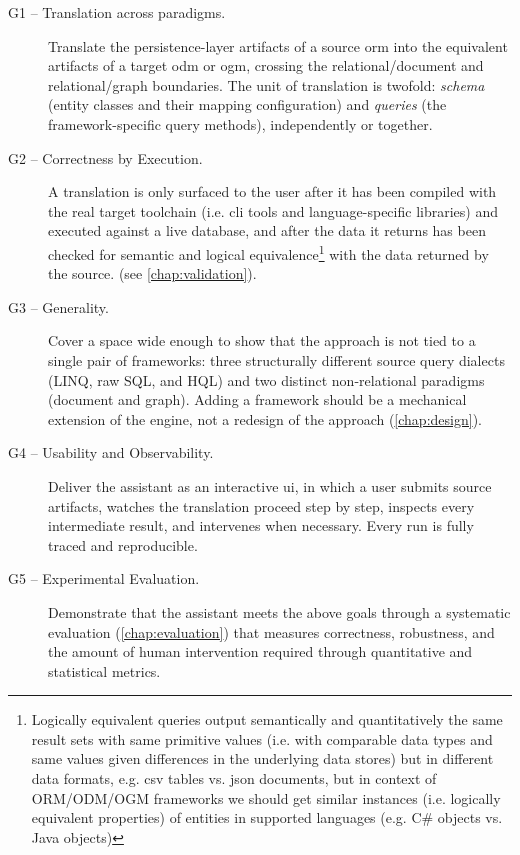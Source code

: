 \begin{description}
  \item[G1 -- Translation across paradigms.] Translate the persistence-layer artifacts of a source \acrshort{orm} into the equivalent artifacts of a target \acrshort{odm} or \acrshort{ogm}, crossing the relational/document and relational/graph boundaries. The unit of translation is twofold: \emph{schema} (entity classes and their mapping configuration) and \emph{queries} (the framework-specific query methods), independently or together.

  \item[G2 -- Correctness by Execution.] A translation is only surfaced to the user after it has been compiled with the real target toolchain (i.e. \Acrfull{cli} tools and language-specific libraries) and executed against a live database, and after the data it returns has been checked for semantic and logical equivalence\footnote{Logically equivalent queries output semantically and quantitatively the same result sets with same primitive values (i.e. with comparable data types and same values given differences in the underlying data stores) but in different data formats, e.g. \acrshort{csv} tables vs. \acrshort{json} documents, but in context of ORM/ODM/OGM frameworks we should get similar instances (i.e. logically equivalent properties) of entities in supported languages (e.g. C\# objects vs. Java objects)} with the data returned by the source. (see \cref{chap:validation}).~\cite{execoder2025}

  \item[G3 -- Generality.] Cover a space wide enough to show that the approach is not tied to a single pair of frameworks: three structurally different source query dialects (LINQ, raw SQL, and HQL) and two distinct non-relational paradigms (document and graph). Adding a framework should be a mechanical extension of the engine, not a redesign of the approach (\cref{chap:design}).

  \item[G4 -- Usability and Observability.] Deliver the assistant as an interactive \Acrfull{ui}, in which a user submits source artifacts, watches the translation proceed step by step, inspects every intermediate result, and intervenes when necessary. Every run is fully traced and reproducible.
  
  \item[G5 -- Experimental Evaluation.] Demonstrate that the assistant meets the above goals through a systematic evaluation (\cref{chap:evaluation}) that measures correctness, robustness, and the amount of human intervention required through quantitative and statistical metrics.


\end{description}
